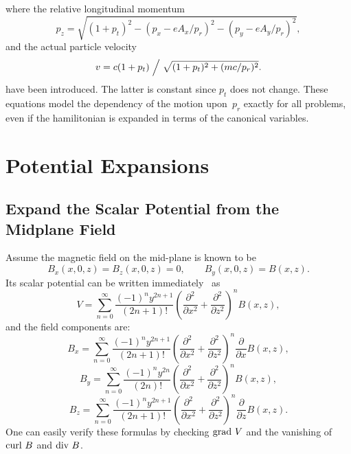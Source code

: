 \documentclass{report}
\begin{document}
where the relative longitudinal momentum
\begin{equation}
  p_z = \sqrt{(1+p_t)^2-(p_x-e A_x/p_r)^2-(p_y-e A_y/p_r)^2},
  \label{eq:plong}
\end{equation}
and the actual particle velocity
\begin{equation}
  v = c (1+p_t) \Bigm/ \sqrt{(1+p_t)^2+(mc/p_r)^2}.
  \label{eq:speed}
\end{equation}
have been introduced.
The latter is constant since $p_t$ does not change.
These equations model the dependency of the motion upon~$p_r$ exactly 
for all problems, even if the hamilitonian is expanded in terms of the
canonical variables.


\clearpage
\section{Potential Expansions}
\label{sec:potential}


\subsection{Expand the Scalar Potential from the Midplane Field}
Assume the magnetic field on the mid-plane is known to be
\begin{equation}
  B_x(x,0,z) = B_z(x,0,z) = 0, \qquad B_y(x,0,z) = B(x,z).
\end{equation}
Its scalar potential can be written immediately~\cite{SLAC-24} as
\begin{equation}
  V = \sum_{n=0}^\infty \frac{(-1)^n y^{2n+1}}{(2n+1)!}
  \left(\frac{\partial^2}{\partial x^2}+
    \frac{\partial^2}{\partial z^2}\right)^n B(x,z),
\end{equation}
and the field components are:
\begin{equation}
  B_x = \sum_{n=0}^\infty \frac{(-1)^n y^{2n+1}}{(2n+1)!}
  \left(\frac{\partial^2}{\partial x^2}+
    \frac{\partial^2}{\partial z^2}\right)^n
  \frac{\partial}{\partial x}B(x,z),
\end{equation}
\begin{equation}
  B_y = \sum_{n=0}^\infty \frac{(-1)^n y^{2n}}{(2n)!}
  \left(\frac{\partial^2}{\partial x^2}+
    \frac{\partial^2}{\partial z^2}\right)^n B(x,z),
\end{equation}
\begin{equation}
  B_z = \sum_{n=0}^\infty \frac{(-1)^n y^{2n+1}}{(2n+1)!}
  \left(\frac{\partial^2}{\partial x^2}+
    \frac{\partial^2}{\partial z^2}\right)^n
  \frac{\partial}{\partial z}B(x,z).
\end{equation}
One can easily verify these formulas by checking $\hbox{grad\ } V$
and the vanishing of $\hbox{curl\ } B$ and $\hbox{div\ } B$.
\end{document}
